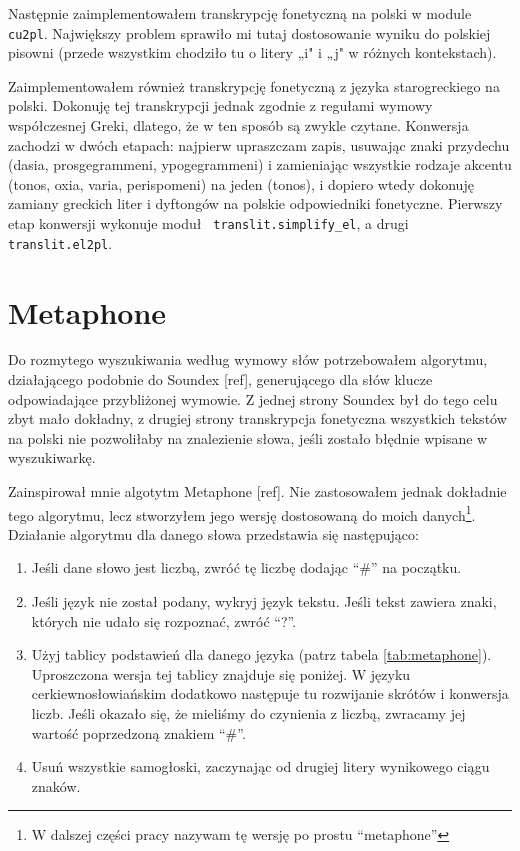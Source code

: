 \documentclass{pracamgr}
\begin{document}
Następnie zaimplementowałem transkrypcję fonetyczną na polski w module
{\tt cu2pl}. Największy problem sprawiło mi tutaj dostosowanie wyniku
do polskiej pisowni (przede wszystkim chodziło tu o litery „i" i „j" w
różnych kontekstach).

Zaimplementowałem również transkrypcję fonetyczną z języka
starogreckiego na polski. Dokonuję tej transkrypcji jednak zgodnie z
regułami wymowy współczesnej Greki, dlatego, że w ten sposób są zwykle
czytane. Konwersja zachodzi w dwóch etapach: najpierw upraszczam
zapis, usuwając znaki przydechu (dasia, prosgegrammeni, ypogegrammeni)
i zamieniając wszystkie rodzaje akcentu (tonos, oxia, varia,
perispomeni) na jeden (tonos), i dopiero wtedy dokonuję zamiany
greckich liter i dyftongów na polskie odpowiedniki
fonetyczne. Pierwszy etap konwersji wykonuje moduł {\tt
  translit.simplify\_el}, a drugi {\tt translit.el2pl}.

\section{Metaphone}

Do rozmytego wyszukiwania według wymowy słów potrzebowałem algorytmu,
działającego podobnie do Soundex [ref], generującego dla słów klucze
odpowiadające przybliżonej wymowie. Z jednej strony Soundex był do
tego celu zbyt mało dokładny, z drugiej strony transkrypcja fonetyczna
wszystkich tekstów na polski nie pozwoliłaby na znalezienie słowa,
jeśli zostało błędnie wpisane w wyszukiwarkę.

Zainspirował mnie algotytm Metaphone [ref]. Nie zastosowałem jednak
dokładnie tego algorytmu, lecz stworzyłem jego wersję dostosowaną do
moich danych\footnote{W dalszej części pracy nazywam tę wersję po
  prostu ``metaphone''}. Działanie algorytmu dla danego słowa
przedstawia się następująco:

\begin{enumerate}
\item Jeśli dane słowo jest liczbą, zwróć tę liczbę dodając ``\#'' na
  początku.
\item Jeśli język nie został podany, wykryj język tekstu. Jeśli tekst
  zawiera znaki, których nie udało się rozpoznać, zwróć ``?''.
\item Użyj tablicy podstawień dla danego języka (patrz tabela
  \ref{tab:metaphone}). Uproszczona wersja tej tablicy znajduje się
  poniżej. W języku cerkiewno\-{}słowiańskim dodatkowo następuje tu
  rozwijanie skrótów i konwersja liczb. Jeśli okazało się, że mieliśmy
  do czynienia z liczbą, zwracamy jej wartość poprzedzoną znakiem
  ``\#''.
\item Usuń wszystkie samogłoski, zaczynając od drugiej litery
  wynikowego ciągu znaków.
\end{enumerate}
\end{document}
